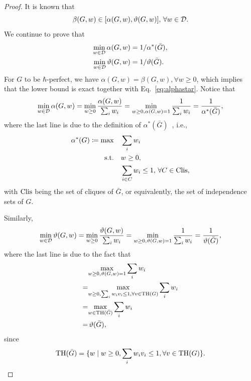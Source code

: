 \begin{proof}
  It is known that
  \begin{equation}
    \beta(G,w) \in [\alpha(G,w), \vartheta(G,w)],\, \forall w \in {\cal D}.
  \end{equation}
  We continue to prove that
  \begin{align}
    \min_{w\in{\cal D}} \alpha(G,w) &= 1/\alpha^*(\bar{G}),\label{eq:alphastar}\\
    \min_{w\in{\cal D}} \vartheta(G,w) &= 1/\vartheta(\bar{G}).
  \end{align}
  For $G$ to be $\hbar$-perfect, we have $\alpha(G,w) = \beta(G,w), \forall w\ge 0$, which implies that the lower bound is exact together with Eq.~\eqref{eq:alphastar}.
  Notice that
  \begin{align}
    \min_{w\in {\cal D}} \alpha(G,w) = \min_{w\ge 0} \frac{\alpha(G,w)}{\sum_i w_i}
                                     = \min_{w\ge 0, \alpha(G,w)=1} \frac{1}{\sum_i w_i}
                                     = \frac{1}{\alpha^*(\bar{G})},
  \end{align}
  where the last line is due to the definition of $\alpha^*(\bar{G})$~\cite{schrijver1979fractional}, i.e.,
  \begin{align}
    \alpha^*(G) \coloneqq \max &\quad\sum_i w_i\nonumber\\
    \mathrm{s.t.}&\quad w\ge 0,\nonumber\\
         &\quad\sum_{i\in C} w_i \le 1, \,\forall C \in {\rm Clis },
  \end{align}
  with ${\rm Clis}$ being the set of cliques of $\bar{G}$, or equivalently, the set of independence sets of $G$.

  Similarly,
  \begin{align}
    \min_{w\in {\cal D}} \vartheta(G,w) = \min_{w\ge 0} \frac{\vartheta(G,w)}{\sum_i w_i} = \min_{w\ge 0, \vartheta(G,w)=1} \frac{1}{\sum_i w_i} = \frac{1}{\vartheta(\bar{G})},
  \end{align}
  where the last line is due to the fact that~\cite{knuth1994sandwich}
  \begin{align}
                                     & {\max_{w\ge 0, \vartheta(G,w)=1} \sum_i w_i}\nonumber\\
  =& {\max_{w\ge 0, \sum_i w_i v_i\le 1, \forall v\in {\rm TH}(G)} \sum_i w_i}\nonumber\\
                                     =& {\max_{w\in {\rm TH}(\bar{G})} \sum_i w_i}\nonumber\\
                                     =& \,\vartheta(\bar{G}),
  \end{align}
  since
  \begin{equation}
  {\rm TH}(\bar{G}) = \{w\mid w\ge 0, \sum_i w_i v_i \le 1, \forall v \in {\rm TH}(G)\}.
  \end{equation}
\end{proof}

